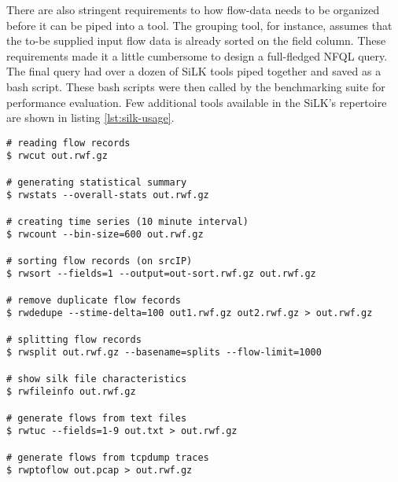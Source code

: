 There are also stringent requirements to how flow-data needs to be organized
before it can be piped into a tool. The grouping tool, for instance, assumes
that the to-be supplied input flow data is already sorted on the field column.
These requirements made it a little cumbersome  to design a full-fledged \ac{NFQL} query. The
final query had over a dozen of SiLK tools piped together and saved as a bash
script. These bash scripts were then called by the benchmarking suite for
performance evaluation.  Few additional tools available in the SiLK's
repertoire are shown in listing \ref{lst:silk-usage}.

\begin{lstlisting}
# reading flow records
$ rwcut out.rwf.gz

# generating statistical summary
$ rwstats --overall-stats out.rwf.gz

# creating time series (10 minute interval)
$ rwcount --bin-size=600 out.rwf.gz

# sorting flow records (on srcIP)
$ rwsort --fields=1 --output=out-sort.rwf.gz out.rwf.gz

# remove duplicate flow fecords
$ rwdedupe --stime-delta=100 out1.rwf.gz out2.rwf.gz > out.rwf.gz

# splitting flow records
$ rwsplit out.rwf.gz --basename=splits --flow-limit=1000

# show silk file characteristics
$ rwfileinfo out.rwf.gz

# generate flows from text files
$ rwtuc --fields=1-9 out.txt > out.rwf.gz

# generate flows from tcpdump traces
$ rwptoflow out.pcap > out.rwf.gz
\end{lstlisting}
